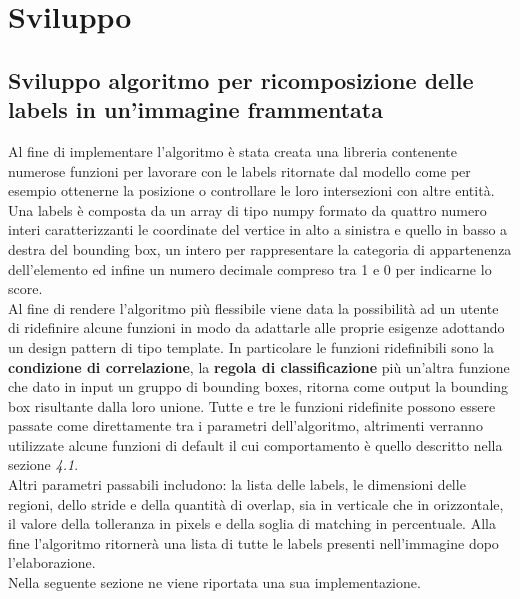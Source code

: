 \section{Sviluppo}
\subsection{Sviluppo algoritmo per ricomposizione delle labels in un'immagine frammentata}
Al fine di implementare l'algoritmo è stata creata una libreria contenente numerose funzioni per lavorare con le labels ritornate dal modello come per esempio ottenerne la posizione o controllare le loro intersezioni con altre entità. Una labels è composta da un array di tipo numpy formato da quattro numero interi caratterizzanti le coordinate del vertice in alto a sinistra e quello in basso a destra del bounding box, un intero per rappresentare la categoria di appartenenza dell'elemento ed infine un numero decimale compreso tra 1 e 0 per indicarne lo score.\\
Al fine di rendere l'algoritmo più flessibile viene data la possibilità ad un utente di ridefinire alcune funzioni in modo da adattarle alle proprie esigenze adottando un design pattern di tipo template. In particolare le funzioni ridefinibili sono la \textbf{condizione di correlazione}, la \textbf{regola di classificazione} più un'altra funzione che dato in input un gruppo di bounding boxes, ritorna come output la bounding box risultante dalla loro unione. Tutte e tre le funzioni ridefinite possono essere passate come direttamente tra i parametri dell'algoritmo, altrimenti verranno utilizzate alcune funzioni di default il cui comportamento è quello descritto nella sezione \textit{4.1}.\\
Altri parametri passabili includono: la lista delle labels, le dimensioni delle regioni, dello stride e della quantità di overlap, sia in verticale che in orizzontale, il valore della tolleranza in pixels e della soglia di matching in percentuale.
Alla fine l'algoritmo ritornerà una lista di tutte le labels presenti nell'immagine dopo l'elaborazione.\\ Nella seguente sezione ne viene riportata una sua implementazione.
